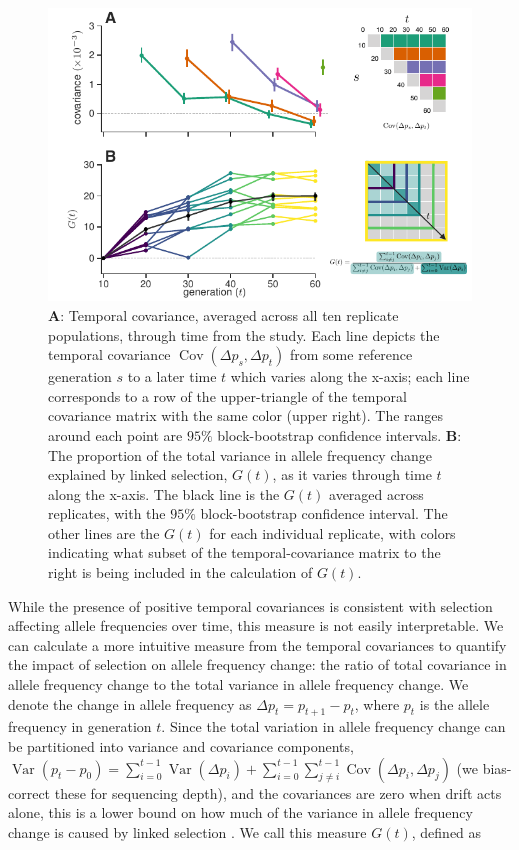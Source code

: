 \documentclass[11pt]{article}
\DeclareMathOperator{\var}{Var}
\DeclareMathOperator{\cov}{Cov}
\begin{document}
\begin{figure}[!htb]
  \centering
  \includegraphics[width=\textwidth]{figure-1-revision.pdf}

  \caption{{\bf A}: Temporal covariance, averaged across all ten replicate
    populations, through time from the \textcite{Barghi2019-qy} study. Each
    line depicts the temporal covariance $\cov(\Delta p_s, \Delta p_t)$ from
    some reference generation $s$ to a later time $t$ which varies along the
    x-axis; each line corresponds to a row of the upper-triangle of the
    temporal covariance matrix with the same color (upper right). The ranges
    around each point are $95\%$ block-bootstrap confidence intervals. {\bf B}: The
    proportion of the total variance in allele frequency change explained by
    linked selection, $G(t)$, as it varies through time $t$ along the x-axis.
    The black line is the $G(t)$ averaged across replicates, with the $95\%$
    block-bootstrap confidence interval. The other lines are the $G(t)$ for
    each individual replicate, with colors indicating what subset of the
    temporal-covariance matrix to the right is being included in the
  calculation of $G(t)$.}

  \label{fig:figure-1}
\end{figure}

While the presence of positive temporal covariances is consistent with
selection affecting allele frequencies over time, this measure is not easily
interpretable. We can calculate a more intuitive measure from the temporal
covariances to quantify the impact of selection on allele frequency change: the
ratio of total covariance in allele frequency change to the total variance in
allele frequency change. We denote the change in allele frequency as $\Delta
p_t = p_{t+1}-p_t$, where $p_t$ is the allele frequency in generation $t$.
Since the total variation in allele frequency change can be partitioned into
variance and covariance components, $\var(p_t - p_0) = \sum_{i=0}^{t-1}
  \var(\Delta p_i) + \sum_{i=0}^{t-1} \sum_{j \ne i}^{t-1} \cov(\Delta p_i,
\Delta p_j)$ (we bias-correct these for sequencing depth), and the
covariances are zero when drift acts alone, this is a lower bound on how much
of the variance in allele frequency change is caused by linked selection
\parencite{Buffalo2019-io}. We call this measure $G(t)$, defined as
\end{document}
